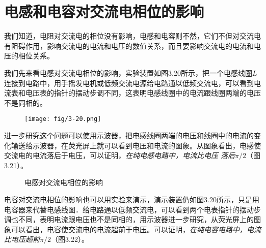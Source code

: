 \section{电感和电容对交流电相位的影响}
我们知道，电阻对交流电的相位没有影响，电感和电容则不然，它们不但对交流电有阻碍作用，影响交流电的电流和电压的数值关系，而且要影响交流电的电流和电压的相位关系。

我们先来看电感对交流电相位的影响，实验装置如图3.20所示，把一个电感线圈$L$连接到电路中，用手摇发电机或低频交流电源给电路通以低频交流电，可以看到电流表和电压表的指针的摆动步调不同，这表明电感线圈中的电流跟线圈两端的电压不是同相的。
\begin{figure}[htp]\centering
    \texttt{[image: fig/3-20.png]}
    \caption{}
    \end{figure}

进一步研究这个问题可以使用示波器，把电感线圈两端的电压和线圈中的电流的变化输送给示波器，在荧光屏上就可以看到电压和电流的图象。从图象看出，电感使交流电的电流落后于电压，可以证明，\textit{在纯电感电路中，电流比电压
落后$\pi/2$}（图3.21）。
\begin{figure}[htp]\centering
\caption{电感对交流电相位的影响}
\end{figure}

电容对交流电相位的影响也可以用实验来演示，演示装置仍如图3.20所示，只是用电容器来代替电感线图．给电路通以低频交流电，可以看到两个电表指针的摆动步调也不同，表明电流跟电压也不是同相的，用示波器进一步研究，从荧光屏上的图象可以看出，电容使交流电的电流超前于电压。可以证明，\textit{在纯电容电路中，电流比电压超前$\pi/2$}（图3.22）。

